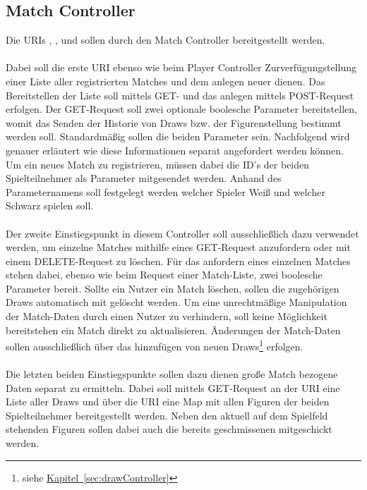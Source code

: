 \subsection{Match Controller}\label{sec:matchController}
Die \glspl{URI} , ,  und  sollen durch den Match Controller bereitgestellt werden.\\
\\
Dabei soll die erste \gls{URI} ebenso wie beim Player Controller Zurverfügungstellung einer Liste aller registrierten Matches und dem anlegen neuer dienen. Das Bereitstellen der Liste soll mittels GET- und das anlegen mittels POST-Request erfolgen. Der GET-Request soll zwei optionale boolesche Parameter bereitstellen, womit das Senden der Historie von Draws bzw. der Figurenstellung bestimmt werden soll. Standardmäßig sollen die beiden Parameter  sein. Nachfolgend wird genauer erläutert wie diese Informationen separat angefordert werden können. Um ein neues Match zu registrieren, müssen dabei die ID's der beiden Spielteilnehmer als Parameter mitgesendet werden. Anhand des Parameternamens soll festgelegt werden welcher Spieler Weiß und welcher Schwarz spielen soll.\\
\\
Der zweite Einstiegspunkt in diesem Controller soll ausschließlich dazu verwendet werden, um einzelne Matches mithilfe eines GET-Request anzufordern oder mit einem DELETE-Request zu löschen. Für das anfordern eines einzelnen Matches stehen dabei, ebenso wie beim Request einer Match-Liste, zwei boolesche Parameter bereit. Sollte ein Nutzer ein Match löschen, sollen die zugehörigen Draws automatisch mit gelöscht werden. Um eine unrechtmäßige Manipulation der Match-Daten durch einen Nutzer zu verhindern, soll keine Möglichkeit bereitstehen ein Match direkt zu aktualisieren. Änderungen der Match-Daten sollen ausschließlich über das hinzufügen von neuen Draws\footnote{siehe \hyperref[sec:drawController]{Kapitel~\ref{sec:drawController}}} erfolgen.\\
\\
Die letzten beiden Einstiegspunkte sollen dazu dienen große Match bezogene Daten separat zu ermitteln. Dabei soll mittels GET-Request an der \gls{URI}  eine Liste aller Draws und über die \gls{URI}  eine Map mit allen Figuren der beiden Spielteilnehmer bereitgestellt werden. Neben den aktuell auf dem Spielfeld stehenden Figuren sollen dabei auch die bereits geschmissenen mitgeschickt werden.\\

